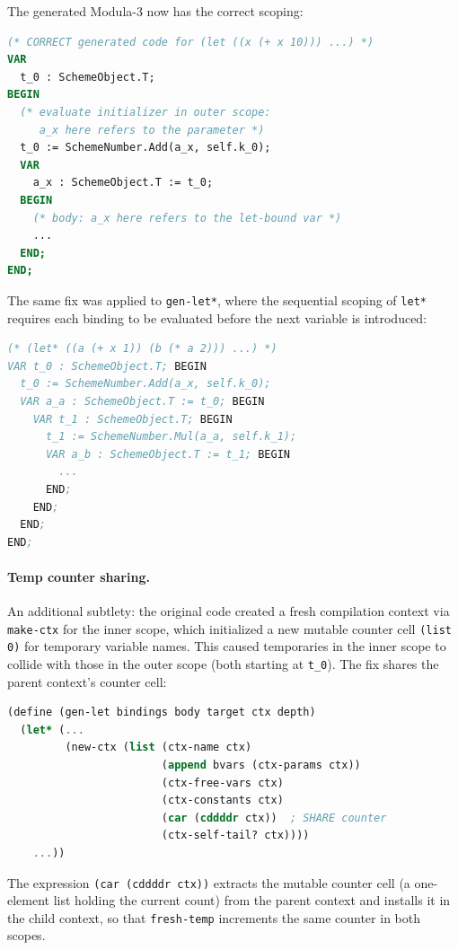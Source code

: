 \documentclass[12pt]{report}
\begin{document}
The generated Modula-3 now has the correct scoping:

\begin{lstlisting}[language=Modula3]
(* CORRECT generated code for (let ((x (+ x 10))) ...) *)
VAR
  t_0 : SchemeObject.T;
BEGIN
  (* evaluate initializer in outer scope:
     a_x here refers to the parameter *)
  t_0 := SchemeNumber.Add(a_x, self.k_0);
  VAR
    a_x : SchemeObject.T := t_0;
  BEGIN
    (* body: a_x here refers to the let-bound var *)
    ...
  END;
END;
\end{lstlisting}

The same fix was applied to \texttt{gen-let*}, where the sequential
scoping of \texttt{let*} requires each binding to be evaluated before
the next variable is introduced:

\begin{lstlisting}[language=Modula3]
(* (let* ((a (+ x 1)) (b (* a 2))) ...) *)
VAR t_0 : SchemeObject.T; BEGIN
  t_0 := SchemeNumber.Add(a_x, self.k_0);
  VAR a_a : SchemeObject.T := t_0; BEGIN
    VAR t_1 : SchemeObject.T; BEGIN
      t_1 := SchemeNumber.Mul(a_a, self.k_1);
      VAR a_b : SchemeObject.T := t_1; BEGIN
        ...
      END;
    END;
  END;
END;
\end{lstlisting}

\paragraph{Temp counter sharing.}
An additional subtlety: the original code created a fresh
compilation context via \texttt{make-ctx} for the inner scope,
which initialized a new mutable counter cell \texttt{(list 0)} for
temporary variable names.  This caused temporaries in the inner
scope to collide with those in the outer scope (both starting at
\texttt{t\_0}).  The fix shares the parent context's counter cell:

\begin{lstlisting}[language=Scheme]
(define (gen-let bindings body target ctx depth)
  (let* (...
         (new-ctx (list (ctx-name ctx)
                        (append bvars (ctx-params ctx))
                        (ctx-free-vars ctx)
                        (ctx-constants ctx)
                        (car (cddddr ctx))  ; SHARE counter
                        (ctx-self-tail? ctx))))
    ...))
\end{lstlisting}

The expression \texttt{(car (cddddr ctx))} extracts the mutable
counter cell (a one-element list holding the current count) from the
parent context and installs it in the child context, so that
\texttt{fresh-temp} increments the same counter in both scopes.
\end{document}
